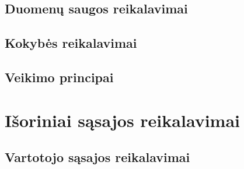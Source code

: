 \documentclass[oneside]{VUMIFPSkursinis}
\begin{document}
\subsection{Duomenų saugos reikalavimai}
\subsection{Kokybės reikalavimai}

\subsection{Veikimo principai}
\section{Išoriniai sąsajos reikalavimai}
\subsection{Vartotojo sąsajos reikalavimai}
\end{document}

